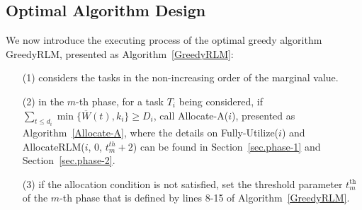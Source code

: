 \documentclass[10pt,journal,compsoc]{IEEEtran}
\newcommand{\tth}{t^{\textrm{th}}}
\begin{document}
\subsection{Optimal Algorithm Design}


We now introduce the executing process of the optimal greedy algorithm GreedyRLM, presented as Algorithm~\ref{GreedyRLM}:
\begin{itemize}
 \setlength\itemsep{0.15em}
\item [(1)] considers the tasks in the non-increasing order of the marginal value.

\item [(2)] in the $m$-th phase, for a task $T_{i}$ being considered, if $\sum_{t\leq d_{i}}{\min\{\overline{W}(t), k_{i}\}}\geq D_{i}$, call Allocate-A($i$), presented as Algorithm~\ref{Allocate-A}, where the details on Fully-Utilize($i$) and AllocateRLM($i$, 0, $t_{m}^{th}+2$) can be found in Section~\ref{sec.phase-1} and Section~\ref{sec.phase-2}.

\item [(3)] if the allocation condition is not satisfied, set the threshold parameter $\tth_m$ of the $m$-th phase that is defined by lines 8-15 of Algorithm~\ref{GreedyRLM}.
\end{itemize}
\end{document}
